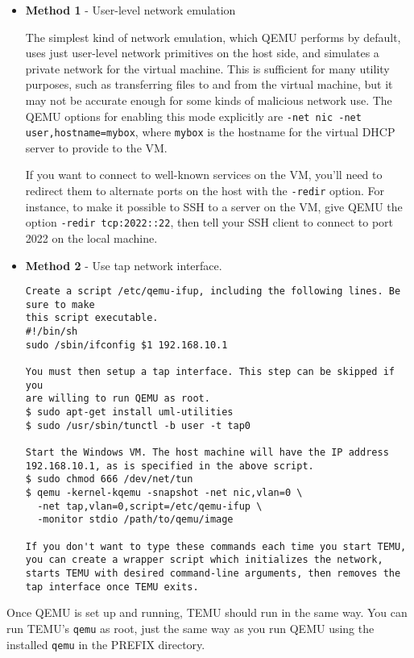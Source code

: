 \begin{itemize}

\item \textbf{Method 1} - User-level network emulation

The simplest kind of network emulation, which QEMU performs by
default, uses just user-level network primitives on the host side, and
simulates a private network for the virtual machine. This is
sufficient for many utility purposes, such as transferring files to
and from the virtual machine, but it may not be accurate enough for
some kinds of malicious network use. The QEMU options for enabling
this mode explicitly are
\verb'-net nic -net user,hostname=mybox', where \verb'mybox' is the
hostname for the virtual DHCP server to provide to the VM.

If you want to connect to well-known services on the VM, you'll need
to redirect them to alternate ports on the host with the
\verb'-redir' option. For instance, to make it possible to SSH to a
server on the VM, give QEMU the option \verb'-redir tcp:2022::22',
then tell your SSH client to connect to port 2022 on the local
machine.

\item \textbf{Method 2} -  Use tap network interface.
\begin{Verbatim}[frame=lines, framesep=.5em]
Create a script /etc/qemu-ifup, including the following lines. Be sure to make 
this script executable.
#!/bin/sh
sudo /sbin/ifconfig $1 192.168.10.1

You must then setup a tap interface. This step can be skipped if you
are willing to run QEMU as root.
$ sudo apt-get install uml-utilities
$ sudo /usr/sbin/tunctl -b user -t tap0

Start the Windows VM. The host machine will have the IP address
192.168.10.1, as is specified in the above script.
$ sudo chmod 666 /dev/net/tun
$ qemu -kernel-kqemu -snapshot -net nic,vlan=0 \
  -net tap,vlan=0,script=/etc/qemu-ifup \
  -monitor stdio /path/to/qemu/image
  
If you don't want to type these commands each time you start TEMU,
you can create a wrapper script which initializes the network,
starts TEMU with desired command-line arguments, then removes the
tap interface once TEMU exits.
\end{Verbatim}

\end{itemize}

Once QEMU is set up and running, TEMU should run in the same way. You
can run TEMU's \texttt{qemu} as root, just the same way as you run
QEMU using the installed \texttt{qemu} in the PREFIX directory.



